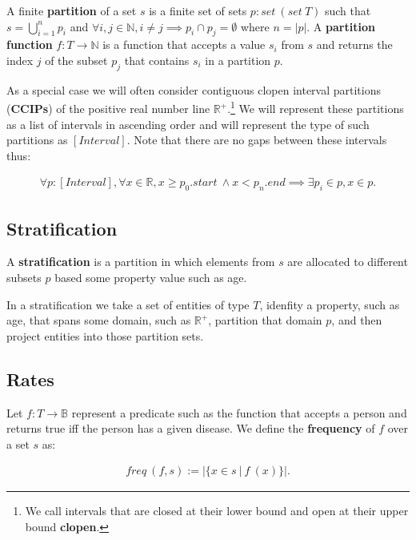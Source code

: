 \documentclass[]{article}
\begin{document}
A finite \textbf{partition} of a set \(s\) is a finite set of sets
\(p : set\ (set\ T)\) such that \(s = \bigcup_{i=1}^n p_i\) and
\(\forall i, j \in \mathbb{N}, i \neq j \implies p_i \cap p_j = \emptyset\)
where \(n = |p|\). A \textbf{partition function}
\(f : T \rightarrow \mathbb{N}\) is a function that accepts a value
\(s_i\) from \(s\) and returns the index \(j\) of the subset \(p_j\)
that contains \(s_i\) in a partition \(p\).

As a special case we will often consider contiguous clopen interval
partitions (\textbf{CCIPs}) of the positive real number line
\(\mathbb{R}^+\).\footnote{We call intervals that are closed at their
  lower bound and open at their upper bound \textbf{clopen}.} We will
represent these partitions as a list of intervals in ascending order and
will represent the type of such partitions as \([Interval]\). Note that
there are no gaps between these intervals thus:

\begin{align*}
\forall p : [Interval], \forall x \in \mathbb{R}, x \ge p_0.start\ \wedge x < p_n.end \implies \exists p_i \in p, x \in p.
\end{align*}

\hypertarget{stratification}{%
\subsection{Stratification}\label{stratification}}

A \textbf{stratification} is a partition in which elements from \(s\)
are allocated to different subsets \(p\) based some property value such
as age.

In a stratification we take a set of entities of type \(T\), idenfity a
property, such as age, that spans some domain, such as \(\mathbb{R}^+\),
partition that domain \(p\), and then project entities into those
partition sets.

\hypertarget{rates}{%
\subsection{Rates}\label{rates}}

Let \(f : T \rightarrow \mathbb{B}\) represent a predicate such as the
function that accepts a person and returns true iff the person has a
given disease. We define the \textbf{frequency} of \(f\) over a set
\(s\) as:

\begin{align*}
freq\ (f, s) := |\{x \in s\ |\ f\ (x)\}|.
\end{align*}
\end{document}
